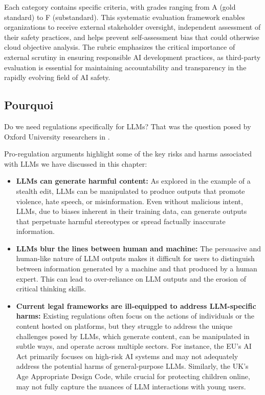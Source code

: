 Each category contains specific criteria, with grades ranging from A (gold standard) to F (substandard). This systematic evaluation framework enables organizations to receive external stakeholder oversight, independent assessment of their safety practices, and helps prevent self-assessment bias that could otherwise cloud objective analysis. The rubric emphasizes the critical importance of external scrutiny in ensuring responsible AI development practices, as third-party evaluation is essential for maintaining accountability and transparency in the rapidly evolving field of AI safety.
\subsection{Pourquoi}

Do we need regulations specifically for LLMs? That was the question posed by Oxford University researchers in .

Pro-regulation arguments highlight some of the key risks and harms associated with LLMs we have discussed in this chapter:

\begin{itemize}
    \item \textbf{LLMs can generate harmful content:} As explored in the example of a stealth edit, LLMs can be manipulated to produce outputs that promote violence, hate speech, or misinformation. Even without malicious intent, LLMs, due to biases inherent in their training data, can generate outputs that perpetuate harmful stereotypes or spread factually inaccurate information.
    
    \item \textbf{LLMs blur the lines between human and machine:} The persuasive and human-like nature of LLM outputs makes it difficult for users to distinguish between information generated by a machine and that produced by a human expert. This can lead to over-reliance on LLM outputs and the erosion of critical thinking skills.
    
    \item \textbf{Current legal frameworks are ill-equipped to address LLM-specific harms:} Existing regulations often focus on the actions of individuals or the content hosted on platforms, but they struggle to address the unique challenges posed by LLMs, which generate content, can be manipulated in subtle ways, and operate across multiple sectors. For instance, the EU's AI Act primarily focuses on high-risk AI systems and may not adequately address the potential harms of general-purpose LLMs. Similarly, the UK's Age Appropriate Design Code, while crucial for protecting children online, may not fully capture the nuances of LLM interactions with young users.
\end{itemize}

